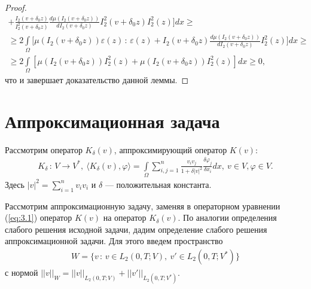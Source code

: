 \documentclass[14pt, a4paper]{extarticle}
\numberwithin{equation}{section}
\begin{document}
\begin{proof}
\begin{equation*}
\begin{gathered}
                + \frac{I_2(v+\delta_0 z)}{I_2^2(v+\delta_0 z)} \frac{d\mu(I_2(v+\delta_0 z))}{dI_2(v+\delta_0 z)} I_2^2(v+\delta_0 z) I_2^2(z) \bigg] dx \geq \\
                \geq 2\int\limits_\Omega \bigg[ \mu(I_2(v+\delta_0 z))\varepsilon(z)\, : \,\varepsilon(z)
                + I_2(v+\delta_0 z) \frac{d\mu(I_2(v+\delta_0 z))}{dI_2(v+\delta_0 z)} I_2^2(z) \bigg] dx \geq \\
                \geq 2\int\limits_\Omega [\mu(I_2(v+\delta_0 z)) I_2^2(z) + \mu(I_2(v+\delta_0 z)) I_2^2(z)] dx \geq 0,
            \end{gathered}
        \end{equation*}
        \noindent что и завершает доказательство данной леммы.
    \end{proof}


    \section{Аппроксимационная задача}

    Рассмотрим оператор $K_\delta(v)$, аппроксимирующий оператор $K(v)$:
    \begin{equation*}
        \begin{gathered}
            K_\delta\, : \,V \rightarrow V^*, \ \langle K_\delta(v), \varphi \rangle =
            \int\limits_\Omega\sum\limits_{i,j = 1}^n \frac{v_i v_j}{1+\delta|v|^2}\frac{\delta\varphi_j}{\delta x_i}dx, \
            v \in V, \varphi \in V.
        \end{gathered}
    \end{equation*}
    Здесь $|v|^2 = \sum^n_{i=1}v_i v_i$ и $\delta$ --- положительная константа.

    Рассмотрим аппроксимационную задачу, заменяя в операторном уравнении (\ref{eq:3.1}) оператор
    $K(v)$ на оператор $K_\delta(v)$. По аналогии определения слабого решения исходной задачи, дадим
    определение слабого решения аппроксимационной задачи. Для этого введем пространство
    \begin{equation*}
        \begin{gathered}
            W = \{ v\, : \,v \in L_2(0,T;V), \ v' \in L_2(0,T;V^*) \}
        \end{gathered}
    \end{equation*}
    \noindent с нормой $||v||_W = ||v||_{L_2(0,T;V)} + ||v'||_{L_2(0,T;V^*)}$.
\end{document}
